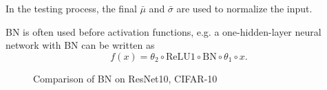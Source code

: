 In the testing process, the final $\bar\mu$ and $\bar\sigma$ are used to normalize the input.

BN is often used before activation functions, e.g. a one-hidden-layer neural network with BN can be written as
\begin{equation}
	\label{bn_1hidden}
	f(x)=\theta_2\circ \text{ReLU1}\circ\text{BN}\circ\theta_1\circ x.
\end{equation}

\begin{figure}[htbp]
	\caption{Comparison of BN on ResNet10, CIFAR-10}
	\label{alo: large k}
\end{figure}

%

